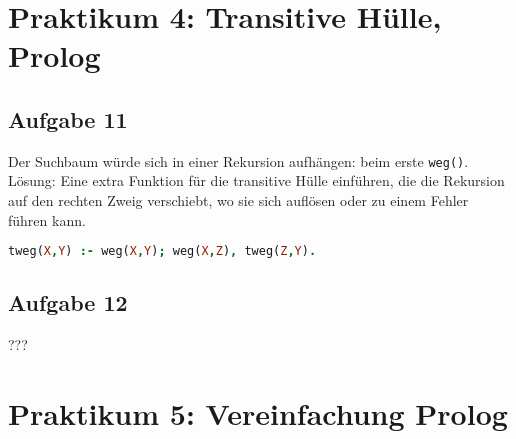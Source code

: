 \documentclass{scrreprt}
\begin{document}
\chapter{Praktikum 4: Transitive Hülle, Prolog}

\section{Aufgabe 11}
Der Suchbaum würde sich in einer Rekursion aufhängen: beim erste \lstinline$weg()$.\\
Lösung: Eine extra Funktion für die transitive Hülle einführen, die die Rekursion auf den rechten Zweig verschiebt, wo sie sich auflösen oder zu einem Fehler führen kann.
\begin{lstlisting}[language=Prolog]
tweg(X,Y) :- weg(X,Y); weg(X,Z), tweg(Z,Y).
\end{lstlisting}

\section{Aufgabe 12}
???

\chapter{Praktikum 5: Vereinfachung Prolog}
\end{document}
